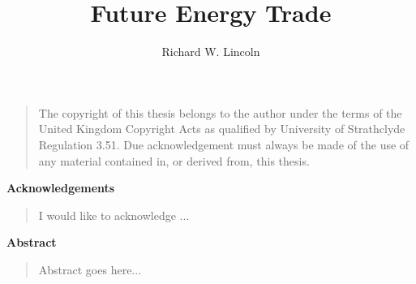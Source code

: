 \documentclass[oneside,11pt]{strath_thesis}
\title{Future Energy Trade}
\author{Richard W. Lincoln}
\begin{document}
\maketitle
\newpage


\thispagestyle{plain}
\begin{quote}
The copyright of this thesis belongs to the author under the terms of the
United Kingdom Copyright Acts as qualified by University of Strathclyde
Regulation 3.51. Due acknowledgement must always be made of the use of any
material contained in, or derived from, this thesis.
\end{quote}
\newpage

\thispagestyle{plain}
\begin{center}
\vspace*{1.5cm}
{\Large \bfseries Acknowledgements}
\end{center}
\vspace{0.5cm}
\begin{quote}
I would like to acknowledge ...
\end{quote}
\newpage

\thispagestyle{plain}
\begin{center}
  \vspace*{1.5cm}
  {\Large \bfseries  Abstract}
\end{center}
\vspace{0.5cm}
\begin{quote}
Abstract goes here...
\end{quote}

\tableofcontents
\listoffigures


\onehalfspacing
\pagestyle{fancy}







\renewcommand{\bibname}{References}

\end{document}
